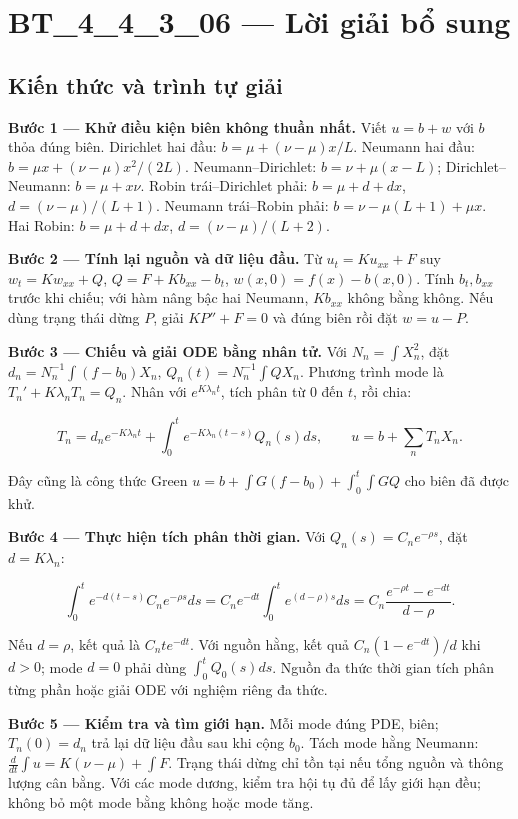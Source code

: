 \documentclass[10pt,a4paper]{article}
\begin{document}
\section*{BT\_4\_4\_3\_06 — Lời giải bổ sung}
\subsection*{Kiến thức và trình tự giải}
\textbf{Bước 1 — Khử điều kiện biên không thuần nhất.} Viết $u=b+w$ với $b$ thỏa đúng biên. Dirichlet hai đầu: $b=\mu+(\nu-\mu)x/L$. Neumann hai đầu: $b=\mu x+(\nu-\mu)x^2/(2L)$. Neumann–Dirichlet: $b=\nu+\mu(x-L)$; Dirichlet–Neumann: $b=\mu+x\nu$. Robin trái–Dirichlet phải: $b=\mu+d+dx$, $d=(\nu-\mu)/(L+1)$. Neumann trái–Robin phải: $b=\nu-\mu(L+1)+\mu x$. Hai Robin: $b=\mu+d+dx$, $d=(\nu-\mu)/(L+2)$.

\textbf{Bước 2 — Tính lại nguồn và dữ liệu đầu.} Từ $u_t=Ku_{xx}+F$ suy $w_t=Kw_{xx}+Q$, $Q=F+Kb_{xx}-b_t$, $w(x,0)=f(x)-b(x,0)$. Tính $b_t,b_{xx}$ trước khi chiếu; với hàm nâng bậc hai Neumann, $Kb_{xx}$ không bằng không. Nếu dùng trạng thái dừng $P$, giải $KP''+F=0$ và đúng biên rồi đặt $w=u-P$.

\textbf{Bước 3 — Chiếu và giải ODE bằng nhân tử.} Với $N_n=\int X_n^2$, đặt $d_n=N_n^{-1}\int(f-b_0)X_n$, $Q_n(t)=N_n^{-1}\int QX_n$. Phương trình mode là $T_n'+K\lambda_nT_n=Q_n$. Nhân với $e^{K\lambda_nt}$, tích phân từ $0$ đến $t$, rồi chia:


\[
T_n=d_ne^{-K\lambda_nt}+\int_0^te^{-K\lambda_n(t-s)}Q_n(s)ds,\qquad
u=b+\sum_nT_nX_n.
\]


Đây cũng là công thức Green $u=b+\int G(f-b_0)+\int_0^t\int GQ$ cho biên đã được khử.

\textbf{Bước 4 — Thực hiện tích phân thời gian.} Với $Q_n(s)=C_ne^{-\rho s}$, đặt $d=K\lambda_n$:


\[
\int_0^te^{-d(t-s)}C_ne^{-\rho s}ds
=C_ne^{-dt}\int_0^te^{(d-\rho)s}ds
=C_n\frac{e^{-\rho t}-e^{-dt}}{d-\rho}.
\]


Nếu $d=\rho$, kết quả là $C_nte^{-dt}$. Với nguồn hằng, kết quả $C_n(1-e^{-dt})/d$ khi $d>0$; mode $d=0$ phải dùng $\int_0^tQ_0(s)ds$. Nguồn đa thức thời gian tích phân từng phần hoặc giải ODE với nghiệm riêng đa thức.

\textbf{Bước 5 — Kiểm tra và tìm giới hạn.} Mỗi mode đúng PDE, biên; $T_n(0)=d_n$ trả lại dữ liệu đầu sau khi cộng $b_0$. Tách mode hằng Neumann: $\frac d{dt}\int u=K(\nu-\mu)+\int F$. Trạng thái dừng chỉ tồn tại nếu tổng nguồn và thông lượng cân bằng. Với các mode dương, kiểm tra hội tụ đủ để lấy giới hạn đều; không bỏ một mode bằng không hoặc mode tăng.
\end{document}
